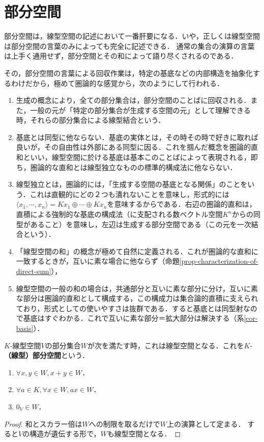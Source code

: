 \documentclass[uplatex, dvipdfmx]{jsreport}
\begin{document}
\section{部分空間}

\begin{tcolorbox}[colframe=ForestGreen, colback=ForestGreen!10!white, breakable]
    部分空間は，線型空間の記述において一番肝要になる．いや，正しくは線型空間は部分空間の言葉のみによっても完全に記述できる．
    通常の集合の演算の言葉は上手く通用せず，部分空間とその和によって語り尽くされるのである．

    その，部分空間の言葉による回収作業は，特定の基底などの内部構造を抽象化するわけだから，極めて圏論的な感覚から，次のようにして行われる．
    \begin{enumerate}
        \item 生成の概念により，全ての部分集合は，部分空間のことばに回収される．また，一般の元が「特定の部分集合が生成する空間の元」として理解できる時，それらの部分集合による線型結合という．
        \item 基底とは同型に他ならない．基底の実体とは，その時その時で好きに取れば良いが，その自由性は外部にある同型に因る．これを掴んだ概念を圏論的直和といい，線型空間に於ける基底は基本このことばによって表現される，即ち，圏論的な直和とは線型独立なものの標準的構成法に他ならない．
        \item 線型独立とは，圏論的には，「生成する空間の基底となる関係」のことをいう．これは直観的にどの２つも潰れないことを意味し，形式的には$\langle x_1,\cdots,x_n\rangle=Kx_1\oplus\cdots\oplus Kx_n$を意味するからである．右辺の圏論的直和は，直積による強制的な基底の構成法（に支配される数ベクトル空間$K^n$からの同型があること）を意味し，左辺は生成する部分空間である（この元を一次結合という）．
        \item 「線型空間の和」の概念が極めて自然に定義される．これが圏論的な直和に一致するときが，互いに素な場合に他ならず（命題\ref{prop-characterization-of-direct-sum}），
        \item 線型空間の一般の和の場合は，共通部分と互いに素な部分に分け，互いに素な部分は圏論的直和として構成する，この構成力は集合論的直積に支えられており，形式としての使いやすさは抜群である．すると基底とは同型射なので基底はすぐわかる．これで互いに素な部分＝拡大部分は解決する（系\ref{cor-basis}）．
    \end{enumerate}
\end{tcolorbox}

\begin{definition}[subspace]
    $K$-線型空間$V$の部分集合$W$が次を満たす時，これは線型空間となる．これを$K$-\textbf{（線型）部分空間}という．
    \begin{enumerate}
        \item $\forall x,y\in W, x+y\in W$．
        \item $\forall  a\in K,  \forall x\in  W, ax \in W$．
        \item $0_V\in W$．
    \end{enumerate}
\end{definition}
\begin{proof}
    和とスカラー倍は$W$への制限を取るだけで$W$上の演算として定まる．
    すると$V$の構造が遺伝する形で，$W$も線型空間となる．
\end{proof}
\end{document}
